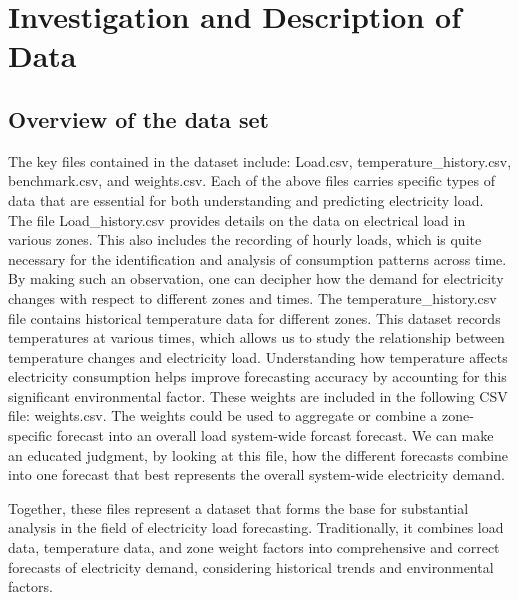\documentclass[12pt, a4paper,twoside]{report}
\theoremstyle{plain} %
\theoremstyle{definition} %
\theoremstyle{remark} %
\numberwithin{equation}{chapter}
\begin{document}
\chapter{Investigation and Description of Data}\label{ch:3}
\section{Overview of the data set}
The key files contained in the dataset include: Load\ry.csv, temperature\_history.csv, benchmark.csv, and weights.csv. Each of the above files carries specific types of data that are essential for both understanding and predicting electricity load.
The file Load\_history.csv provides details on the data on electrical load in various zones. This also includes the recording of hourly loads, which is quite necessary for the identification and analysis of consumption patterns across time. By making such an observation, one can decipher how the demand for electricity changes with respect to different zones and times.
The temperature\_history.csv file contains historical temperature data for different zones. This dataset records temperatures at various times, which allows us to study the relationship between temperature changes and electricity load. Understanding how temperature affects electricity consumption helps improve forecasting accuracy by accounting for this significant environmental factor.
These weights are included in the following CSV file: weights.csv. The weights could be used to aggregate or combine a zone-specific forecast into an overall load system-wide forcast forecast. We can make an educated judgment, by looking at this file, how the different forecasts combine into one forecast that best represents the overall system-wide electricity demand.

Together, these files represent a dataset that forms the base for substantial analysis in the field of electricity load forecasting. Traditionally, it combines load data, temperature data, and zone weight factors into comprehensive and correct forecasts of electricity demand, considering historical trends and environmental factors.
\end{document}
